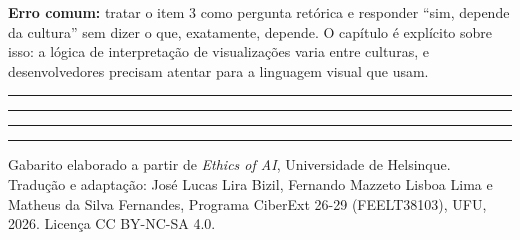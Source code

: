 \documentclass[
  11pt,
]{article}
\newcommand{\faixaEixos}[1][\linewidth]{%
  \noindent
  \textcolor{iaConceitos}{\rule{0.3333#1}{4pt}}%
  \textcolor{iaAplic}{\rule{0.3333#1}{4pt}}%
  \textcolor{iaRiscos}{\rule{0.3333#1}{4pt}}%
  \par}
\newenvironment{licenca}
  {\par\vspace{2em}\faixaEixos\par\vspace{0.8em}
   \begingroup\sffamily\scriptsize\color{iaTintaFraca}}
  {\endgroup\par}
\begin{document}
\textbf{Erro comum:} tratar o item 3 como pergunta retórica e responder
``sim, depende da cultura'' sem dizer o que, exatamente, depende. O
capítulo é explícito sobre isso: a lógica de interpretação de
visualizações varia entre culturas, e desenvolvedores precisam atentar
para a linguagem visual que usam.

\begin{center}\rule{0.5\linewidth}{0.5pt}\end{center}

\begin{licenca}

Gabarito elaborado a partir de \emph{Ethics of AI}, Universidade de
Helsinque. Tradução e adaptação: José Lucas Lira Bizil, Fernando Mazzeto
Lisboa Lima e Matheus da Silva Fernandes, Programa CiberExt 26-29
(FEELT38103), UFU, 2026. Licença CC BY-NC-SA 4.0.

\end{licenca}
\end{document}
